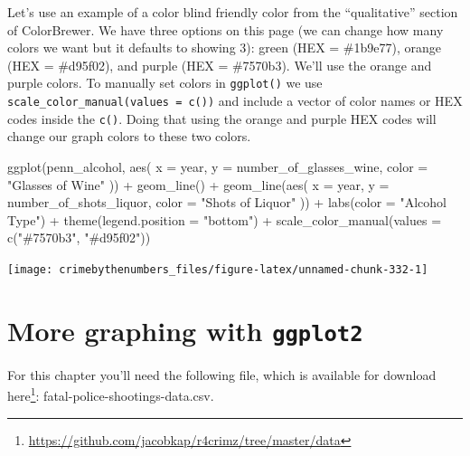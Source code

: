 \documentclass[
]{krantz}
\makeatletter
\newenvironment{Shaded}{\begin{snugshade}}{\end{snugshade}}
\newcommand{\AttributeTok}[1]{\textcolor[rgb]{0.61,0.61,0.61}{#1}}
\newcommand{\FunctionTok}[1]{\textcolor[rgb]{0,0,0}{#1}}
\newcommand{\NormalTok}[1]{#1}
\newcommand{\SpecialCharTok}[1]{\textcolor[rgb]{0,0,0}{#1}}
\newcommand{\StringTok}[1]{\textcolor[rgb]{0.5,0.5,0.5}{#1}}
\renewcommand{\href}[2]{#2\footnote{\url{#1}}}
\newenvironment{kframe}{%
\medskip{}
\setlength{\fboxsep}{.8em}
 \def\at@end@of@kframe{}%
 \ifinner\ifhmode%
  \def\at@end@of@kframe{\end{minipage}}%
  \begin{minipage}{\columnwidth}%
 \fi\fi%
 \def\FrameCommand##1{\hskip\@totalleftmargin \hskip-\fboxsep
 \colorbox{shadecolor}{##1}\hskip-\fboxsep
     \hskip-\linewidth \hskip-\@totalleftmargin \hskip\columnwidth}%
 \MakeFramed {\advance\hsize-\width
   \@totalleftmargin\z@ \linewidth\hsize
   \@setminipage}}%
 {\par\unskip\endMakeFramed%
 \at@end@of@kframe}
\renewenvironment{Shaded}{\begin{kframe}}{\end{kframe}}
\makeatother
\begin{document}
Let's use an example of a color blind friendly color from
the ``qualitative'' section of ColorBrewer. We have three
options on this page (we can change how many colors we want
but it defaults to showing 3): green (HEX = \#1b9e77),
orange (HEX = \#d95f02), and purple (HEX = \#7570b3). We'll
use the orange and purple colors. To manually set colors in
\texttt{ggplot()} we use
\texttt{scale\_color\_manual(values\ =\ c())} and include a
vector of color names or HEX codes inside the \texttt{c()}.
Doing that using the orange and purple HEX codes will change
our graph colors to these two colors.

\begin{Shaded}
\begin{Highlighting}[]
\FunctionTok{ggplot}\NormalTok{(penn\_alcohol, }\FunctionTok{aes}\NormalTok{(}
  \AttributeTok{x =}\NormalTok{ year,}
  \AttributeTok{y =}\NormalTok{ number\_of\_glasses\_wine,}
  \AttributeTok{color =} \StringTok{"Glasses of Wine"}
\NormalTok{)) }\SpecialCharTok{+}
  \FunctionTok{geom\_line}\NormalTok{() }\SpecialCharTok{+}
  \FunctionTok{geom\_line}\NormalTok{(}\FunctionTok{aes}\NormalTok{(}
    \AttributeTok{x =}\NormalTok{ year,}
    \AttributeTok{y =}\NormalTok{ number\_of\_shots\_liquor,}
    \AttributeTok{color =} \StringTok{"Shots of Liquor"}
\NormalTok{  )) }\SpecialCharTok{+}
  \FunctionTok{labs}\NormalTok{(}\AttributeTok{color =} \StringTok{"Alcohol Type"}\NormalTok{) }\SpecialCharTok{+}
  \FunctionTok{theme}\NormalTok{(}\AttributeTok{legend.position =} \StringTok{"bottom"}\NormalTok{) }\SpecialCharTok{+}
  \FunctionTok{scale\_color\_manual}\NormalTok{(}\AttributeTok{values =} \FunctionTok{c}\NormalTok{(}\StringTok{"\#7570b3"}\NormalTok{, }\StringTok{"\#d95f02"}\NormalTok{))}
\end{Highlighting}
\end{Shaded}

\begin{center}\texttt{[image: crimebythenumbers\_files/figure-latex/unnamed-chunk-332-1]} \end{center}

\hypertarget{ois-graphs}{%
\chapter{\texorpdfstring{More graphing with
\texttt{ggplot2}}{More graphing with ggplot2}}\label{ois-graphs}}

For this chapter you'll need the following file, which is
available for download
\href{https://github.com/jacobkap/r4crimz/tree/master/data}{here}:
fatal-police-shootings-data.csv.
\end{document}
